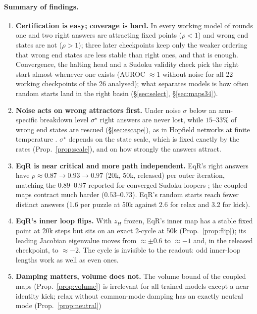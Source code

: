 \documentclass[11pt]{article}
\theoremstyle{definition}
\newcommand{\zH}{z_H}
\begin{document}
\paragraph{Summary of findings.}
\begin{enumerate}[leftmargin=*,itemsep=1pt]
\item \textbf{Certification is easy; coverage is hard.} In every working model of rounds one and two right answers are attracting fixed points
($\rho<1$) and wrong end states are not ($\rho>1$); three later checkpoints keep only the weaker ordering that wrong end states are less stable
than right ones, and that is enough. Convergence, the halting head and a Sudoku validity check pick
the right start almost whenever one exists (AUROC $\approx 1$ without noise for all 22 working checkpoints of the 26 analysed); what separates models is how often random
starts land in the right basin (\S\ref{sec:select}, \S\ref{sec:maps34}).
\item \textbf{Noise acts on wrong attractors first.} Under noise $\sigma$ below an arm-specific breakdown level $\sigma^\star$ right
answers are never lost, while $15$--$33\%$ of wrong end states are rescued (\S\ref{sec:escape}), as in Hopfield
networks at finite temperature \cite{amit1985storing,coolen2000statics}. $\sigma^\star$ depends on the state scale, which is fixed
exactly by the rates (Prop.~\ref{prop:scale}), and on how strongly the answers attract.
\item \textbf{EqR is near critical and more path independent.} EqR's right answers have $\rho\approx0.87\to0.93\to0.97$
(20k, 50k, released) per outer iteration, matching the $0.89$--$0.97$ reported for converged Sudoku loopers
\cite{labovich2026stability}; the coupled maps contract much harder ($0.53$--$0.73$). EqR's random starts reach fewer distinct
answers (1.6 per puzzle at 50k against 2.6 for relax and 3.2 for kick).
\item \textbf{EqR's inner loop flips.} With $\zH$ frozen, EqR's inner map has a stable fixed point at 20k steps but sits on an exact
2-cycle at 50k (Prop.~\ref{prop:flip}); its leading Jacobian eigenvalue moves from $\approx\pm0.6$ to $\approx-1$ and, in the released
checkpoint, to $\approx-2$. The cycle is invisible to the readout: odd inner-loop lengths work as well as even ones.
\item \textbf{Damping matters, volume does not.} The volume bound of the coupled maps (Prop.~\ref{prop:volume}) is irrelevant for all
trained models except a near-identity kick; relax without common-mode damping has an exactly neutral mode (Prop.~\ref{prop:neutral})

\end{enumerate}
\end{document}
